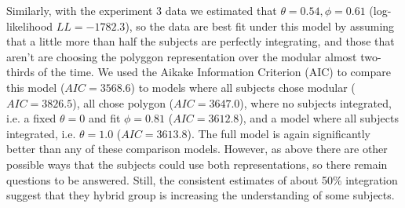 \documentclass[man,10pt]{apa6}
\begin{document}
Similarly, with the experiment 3 data we estimated that $\theta = 0.54, \phi = 0.61$ (log-likelihood $LL=-1782.3$), so the data are best fit under this model by assuming that a little more than half the subjects are perfectly integrating, and those that aren't are choosing the polyggon representation over the modular almost two-thirds of the time. We used the Aikake Information Criterion (AIC) to compare this model ($AIC = 3568.6$) to models where all subjects chose modular ($AIC=3826.5$), all chose polygon ($AIC = 3647.0$), where no subjects integrated, i.e. a fixed $\theta = 0$ and fit $\phi = 0.81$ ($AIC = 3612.8$), and a model where all subjects integrated, i.e. $\theta = 1.0$ ($AIC = 3613.8$). The full model is again significantly better than any of these comparison models. However, as above there are other possible ways that the subjects could use both representations, so there remain questions to be answered. Still, the consistent estimates of about 50\% integration suggest that they hybrid group is increasing the understanding of some subjects.\\
\end{document}
